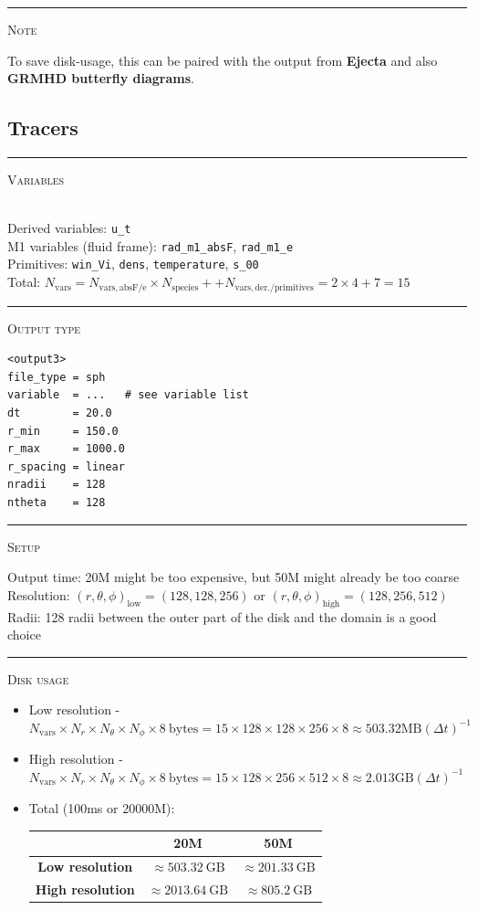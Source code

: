 \documentclass{article}
\newcommand{\var}[1]{%
  {\setlength{\fboxsep}{1.5pt}%
   \colorbox{varbg}{\textcolor{varfg}{\texttt{\small #1}}}}}
\newcommand{\step}[1]{%
  \par\medskip\noindent
  {\color{stepfg}\rule[-0.15ex]{2pt}{1.5ex}\hspace{0.5em}\scshape #1}%
  \hspace{0.75em}\ignorespaces}
\begin{document}
\step{Note}
To save disk-usage, this can be paired with the output from \textbf{Ejecta} and also
\textbf{GRMHD butterfly diagrams}.

\subsection*{Tracers}
\step{Variables}\mbox{}\\
Derived variables: \var{u\_t}\\
M1 variables (fluid frame): \var{rad\_m1\_absF}, \var{rad\_m1\_e}\\
Primitives: \var{win\_Vi}, \var{dens}, \var{temperature}, \var{s\_00}\\
Total: $\boxed{N_{\mathrm{vars}}}=N_{\mathrm{vars, absF/e}}\times N_{\mathrm{species}}++N_{\mathrm{vars, der./primitives}}=2\times4+7=\boxed{15}$

\step{Output type}
\begin{verbatim}
<output3>
file_type = sph
variable  = ...   # see variable list
dt        = 20.0
r_min     = 150.0
r_max     = 1000.0
r_spacing = linear
nradii    = 128
ntheta    = 128
\end{verbatim}

\step{Setup}
Output time: 20M might be too expensive, but 50M might already be too coarse
Resolution: $(r,\theta,\phi)_{\mathrm{low}}=(128,128,256)$ or  $(r,\theta,\phi)_{\mathrm{high}}=(128,256,512)$\\
Radii: 128 radii between the outer part of the disk and the domain is a good choice

\step{Disk usage}
\begin{itemize}
  \item Low resolution - $N_{\mathrm{vars}}\times N_r\times N_{\theta}\times N_{\phi}\times 8\ \mathrm{bytes}=15\times128\times128\times256\times8\approx \boxed{503.32\mathrm{MB}(\Delta t)^{-1}}$
  \item High resolution - $N_{\mathrm{vars}}\times N_r\times N_{\theta}\times N_{\phi}\times 8\ \mathrm{bytes}=15\times128\times256\times512\times8\approx \boxed{2.013\mathrm{GB}(\Delta t)^{-1}}$
  \item Total (100ms or 20000M):
  \begin{raggedleft}
    \begin{tabular}{|c|c|c|}
      \hline
      &\textbf{20M}&\textbf{50M}\\
      \hline
      \textbf{Low resolution}&$\approx503.32 \ \mathrm{GB}$&$\approx201.33 \ \mathrm{GB}$\\
      \hline
      \textbf{High resolution}&$\approx 2013.64\ \mathrm{GB}$&$\approx 805.2\ \mathrm{GB}$\\
      \hline
    \end{tabular}
  \end{raggedleft}
\end{itemize}
\end{document}
